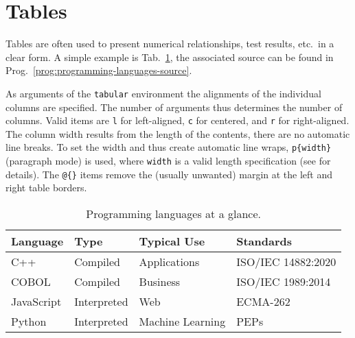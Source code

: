 \section{Tables}
\label{sec:Tables}

Tables are often used to present numerical relationships, test results, etc.\
in a clear form. A simple example is Tab.~\ref{tab:programming-languages},
the associated \latex source can be found in 
Prog.~\ref{prog:programming-languages-source}.

As arguments of the \texttt{tabular} environment the alignments of the
individual columns are specified. The number of arguments thus determines the
number of columns. Valid items are \texttt{l} for left-aligned, \texttt{c}
for centered, and \texttt{r} for right-aligned. The column width results from
the length of the contents, there are no automatic line breaks. To set the
width and thus create automatic line wraps, \verb|p{width}| (paragraph mode)
is used, where \texttt{width} is a valid length specification (see
\cite{WikibooksLaTeXLengths2018} for details). The \verb|@{}| items remove
the (usually unwanted) margin at the left and right table borders.

\begin{table}
    \caption{Programming languages at a glance.}
    \label{tab:programming-languages}
    \centering
    \setlength{\tabcolsep}{10pt} 				%
    \renewcommand{\arraystretch}{1.25}	%
    \begin{tabular}{@{}llll@{}}
        \toprule
        Language & Type        & Typical Use      & Standards          \\
        \midrule
        C++        & Compiled    & Applications     & ISO/IEC 14882:2020 \\
        COBOL      & Compiled    & Business         & ISO/IEC 1989:2014  \\
        JavaScript & Interpreted & Web              & ECMA-262           \\
        Python     & Interpreted & Machine Learning & PEPs               \\
        \bottomrule
    \end{tabular}
\end{table}

